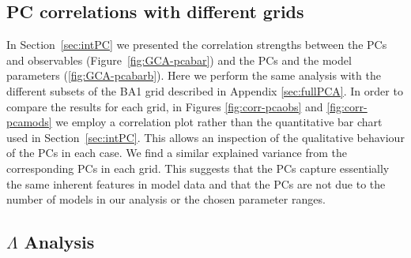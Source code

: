 \subsection{PC correlations with different grids}
\label{sec:PCAg}
In Section~\ref{sec:intPC}  we presented the correlation strengths between the PCs and observables (Figure~\ref{fig:GCA-pcabar}) and the PCs and the model parameters (\ref{fig:GCA-pcabarb}). 
 Here we perform the same analysis with the different subsets of the BA1 grid described in Appendix \ref{sec:fullPCA}. In order to compare the results for each grid, in Figures \ref{fig:corr-pcaobs} and \ref{fig:corr-pcamods} we employ a correlation plot rather than the quantitative bar chart used in Section~\ref{sec:intPC}. This allows an inspection of the qualitative behaviour of the PCs in each case. We find a similar explained variance from the corresponding PCs in each grid. This suggests that the PCs capture essentially the same inherent features in model data and that the PCs are not due to the number of models in our analysis or the chosen parameter ranges.


\subsection{$\Lambda$ Analysis}
\label{sec:lambdaa}

